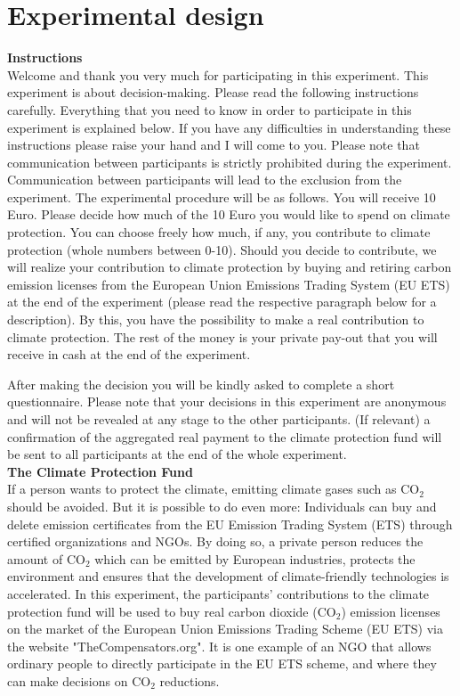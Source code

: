 \documentclass[review, authoryear,12pt]{elsarticle}
\begin{document}
\section{Experimental design}
\label{appa}
\textbf{Instructions} \\
Welcome and thank you very much for participating in this experiment.
This experiment is about decision-making. Please read the following instructions carefully. Everything that you need to know in order to participate in this experiment is explained below. If you have any difficulties in understanding these instructions please raise your hand and I will come to you.
Please note that communication between participants is strictly prohibited during the experiment. Communication between participants will lead to the exclusion from the experiment.
The experimental procedure will be as follows.
You will receive 10 Euro. Please decide how much of the 10 Euro you would like to spend on climate protection. You can choose freely how much, if any, you contribute to climate protection (whole numbers between 0-10).
Should you decide to contribute, we will realize your contribution to climate protection by buying and retiring carbon emission licenses from the European Union Emissions Trading System (EU ETS) at the end of the experiment (please read the respective paragraph below for a description). By this, you have the possibility to make a real contribution to climate protection. The rest of the money is your private pay-out that you will receive in cash at the end of the experiment.

After making the decision you will be kindly asked to complete a short questionnaire.
Please note that your decisions in this experiment are anonymous and will not be revealed at any stage to the other participants. (If relevant) a confirmation of the aggregated real payment to the climate protection fund will be sent to all participants at the end of the whole experiment. \\

\textbf{The Climate Protection Fund} \\
If a person wants to protect the climate, emitting climate gases such as CO$_2$ should be avoided. But it is possible to do even more: Individuals can buy and delete emission certificates from the EU Emission Trading System (ETS) through certified organizations and NGOs. By doing so, a private person reduces the amount of CO$_2$ which can be emitted by European industries, protects the environment and ensures that the development of climate-friendly technologies is accelerated.
In this experiment, the participants' contributions to the climate protection fund will be used to buy real carbon dioxide (CO$_2$) emission licenses on the market of the European Union Emissions Trading Scheme (EU ETS) via the website "TheCompensators.org". It is one example of an NGO that allows ordinary people to directly participate in the EU ETS scheme, and where they can make decisions on CO$_2$ reductions.
\end{document}
